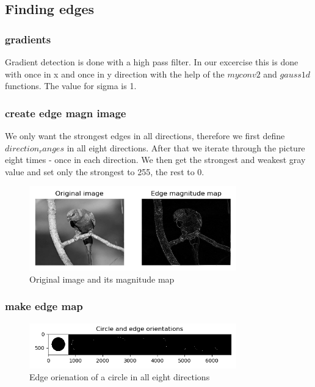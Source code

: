 \documentclass[12pt]{article}
\begin{document}
\subsection{Finding edges}
\subsubsection{gradients}
Gradient detection is done with a high pass filter. In our excercise this is done with
once in x and once in y direction with the help of the $myconv2$ and $gauss1d$ functions.
The value for sigma is 1. 

\subsubsection{create edge magn image}
We only want the strongest edges in all directions, therefore we first define $direction_ranges$
in all eight directions. After that we iterate through the picture eight times - 
once in each direction. We then get the strongest and weakest gray value and
set only the strongest to 255, the rest to 0.

\begin{figure}[!htb]
    \centering
    \includegraphics[width=0.8\textwidth]{pics/edgeMagnitudeMap}
    \caption{Original image and its magnitude map}
    \label{fig:magnitude}
\end{figure}

\subsubsection{make edge map}

\begin{figure}[!htb]
    \centering
    \includegraphics[width=0.8\textwidth]{pics/circleEdgeOrientation}
    \caption{Edge orienation of a circle in all eight directions}
    \label{fig:edgemap}
\end{figure}
\end{document}
